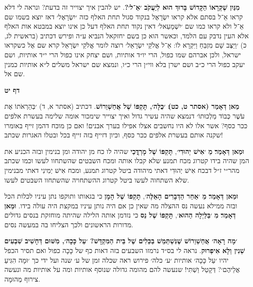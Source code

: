 \documentclass[12pt, openany]{book}
\newcommand{\sethebfont}{
\fontsize{10.5pt}{13.1pt} \selectfont
}
\newcommand{\textblock}[1]{
{\sethebfont #1\\}	
}
\newcommand{\sectname}{}
\newcommand{\newsection}[1]{
	\renewcommand{\sectname}{#1}	
	\vspace{-\baselineskip}
	\begin{center}
		\textbf{%
\fontsize{16pt}{16pt}\selectfont
			#1}
	\end{center}
	\vspace{-\baselineskip}
	\nopagebreak
}
\begin{document}
\textblock{\textbf{מִנַּיִן שֶׁקְּרָאוֹ הַקָּדוֹשׁ בָּרוּךְ הוּא לְיַעֲקֹב ׳אֵ־ל׳?}. יש להבין איך יצוייר זה בדעת? ונראה לי דלא קראו אֵ־ל בסתם אלא קראו יִשְׂרָאֶל בנקוד סגול תחת האלף כזה ׳יִשְׂרָאֶל׳ דאז יוצא בשמו שם אֵ־ל ולא קראו כמו שם ׳יִשְׁמָעֵאל׳ דאין נקוד תחת האלף דעל כן אינו יוצא במבטא אות האלף אלא העין נדבק עם הלמד, וכאשר הוא כן בשם יחזקאל הנביא ע״ה ופירש דכתיב {\small (בראשית לג, כ)} ׳וַיַּצֶּב שָׁם מִזְבֵּחַ וַיִּקְרָא לוֹ: אֵ־ל אֱלֹקֵי יִשְׂרָאֵל׳ רוצה לומר אֱלֹקֵי יִשְׂרָאֵל קרא שם אֶל כשקראו ישראל, ולכן אברהם שמו כפול, הרי יו״ד אותיות, ושם יצחק אינו כפול הרי י״ד אותיות, ושם יעקב כפול הרי כ״ב ושם ישרן בלא ווי״ן הרי כ״ו, ונמצא שם ישראל משלים ל״א אותיות כמנין שם אל.}
\clearpage
\newsection{דף יט}
\textblock{\textbf{מַאן דְּאָמַר {\small (אסתר ט, כט)}׃ ׳כֻּלָּה׳, תָּקְפּוֹ שֶׁל אֲחַשְׁוֵרוֹשׁ}. דכתיב {\small (אסתר א, ד)} ׳בְּהַרְאֹתוֹ אֶת עֹשֶׁר כְּבוֹד מַלְכוּתוֹ׳ דנמצא שהיה עשיר גדול ואיך יצוייר שימכור אומה שלימה בעשרת אלפים ככר כסף? אשר אלו לא היו נחשבים אצלו אפילו בערך אבנים! ואם כן מוכח דהמן זייף באומרו שקנה אותם בעשרת אלפים ככר כסף, וכיון דזייף בזה זייף בכל ובטלו האגרות שכתב!\par \textbf{וּמַאן דְּאָמַר}׃ \textbf{מֵ} ׳\textbf{אִישׁ יְהוּדִי}׳, \textbf{תָּקְפּוֹ שֶׁל מָרְדֳּכַי} שהיה לו כח מן יהודה ומן בנימין ובזה הכניע את המן שהיה בידו קטרוג מכח תמנע שלא קבלו אותה ומכח השבטים שהשתחוו לעשו וכמו שכתב מהר״י ז״ל דבכח אִישׁ יְהוּדִי דאתי מיהודה ביטל קטרוג תמנע, ומכח אִישׁ יְמִינִי דאתי מבנימין שלא השתחוה לעשו ביטל קטרוג ההשתחויה שהשתחוו השבטים לעשו.\par \textbf{וּמַאן דְּאָמַר}׃ \textbf{מֵ} ׳\textbf{אַחַר הַדְּבָרִים הָאֵלֶּה}׳, \textbf{תָּקְפּוֹ שֶׁל הָמָן} כי בגאותו ותוקפו נתן עיניו לכלות הכל ובזה ממילא נעשה נס ההצלה מה שאין כן אם היה נותן עיניו במקצת היה עולה בידו. \textbf{וּמַאן דְּאָמַר}׃ \textbf{מִ} ׳\textbf{בַּלַּיְלָה הַהוּא}׳, \textbf{תָּקְפּוֹ שֶׁל נֵס} כי נזדמן אותה הלילה שהיתה מוחזקת בנסים גדולים מדורות הראשונים ולכך הצליחו בה במעשה נסים.}
\textblock{\textbf{׳מָה רָאָה׳ אֲחַשְׁוֵרוֹשׁ שֶׁנִּשְׁתַּמֵּשׁ בַּכֵּלִים שֶׁל בֵּית הַמִּקְדָּשׁ? ׳עַל כָּכָה׳, מִשּׁוּם דְּחָשִׁיב שִׁבְעִים שְׁנִין וְלָא אִיפְרוּק}. נראה לי בס״ד נרמזו השבעים בזה דאות כף של כָּכָה כפול ואם תסיר הכפל יהיו ׳עַל כָּכָה׳ אותיות ׳ע׳ כלה׳ פירוש ראה שכלה זמן של ע׳ שנה ועל ידי כך ׳וּמָה הִגִּיעַ אֲלֵיהֶם׳? דְּקָטַל וַשְׁתִּי! שנעשה להם מהומה גדולה שנוסף אותיות ומה על אותיות מה ונעשה צירוף מְהוּמָה.}
\end{document}
